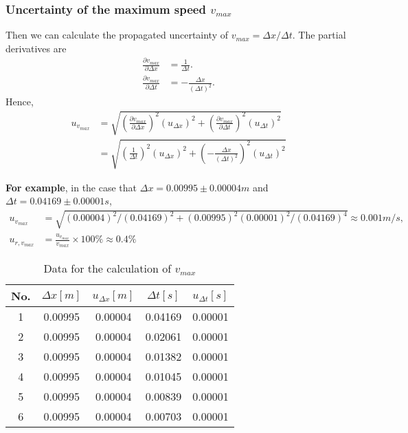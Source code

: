 \subsubsection{Uncertainty of the maximum speed $v_{max}$}
    Then we can calculate the propagated uncertainty of $v_{max}=\Delta x/\Delta t$. The partial derivatives are
    \[
    \begin{split}
        \frac{\partial v_{max}}{\partial \Delta x}&=\frac{1}{\Delta t}.\\[0.5cm]
        \frac{\partial v_{max}}{\partial \Delta t}&=-\frac{\Delta x}{(\Delta t)^2}.    
    \end{split}    
    \]
    Hence,
    \[
    \begin{split}
        u_{v_{max}}&=\sqrt{(\frac{\partial v_{max}}{\partial \Delta x})^2(u_{\Delta x})^2+(\frac{\partial v_{max}}{\partial \Delta t})^2(u_{\Delta t})^2}\\[0.4cm]
        &=\sqrt{(\frac{1}{\Delta t})^2(u_{\Delta x})^2+(-\frac{\Delta x}{(\Delta t)^2})^2(u_{\Delta t})^2}
    \end{split}
    \]

    \textbf{For example}, in the case that $\Delta x=0.00995\pm 0.00004m$ and $\Delta t=0.04169\pm 0.00001s$,
    \[
    \begin{split}
        u_{v_{max}}&=\sqrt{(0.00004)^2/(0.04169)^2+(0.00995)^2(0.00001)^2/(0.04169)^4}\approx0.001m/s,\\
        u_{r,v_{max}}&=\frac{u_{v_{max}}}{v_{max}}\times100\%\approx0.4\%
    \end{split}
    \]
    \begin{table}[!h] \small
        \centering
        \begin{tabular}{|c|c|c|c|c|}
            \hline
            No. & $\Delta x[m]$ & $u_{\Delta x}[m]$ & $\Delta t[s]$ & $u_{\Delta t}[s]$\\ \hline
            1 & 0.00995 & 0.00004 & 0.04169 & 0.00001\\ \hline
            2 & 0.00995 & 0.00004 & 0.02061 & 0.00001\\ \hline
            3 & 0.00995 & 0.00004 & 0.01382 & 0.00001\\ \hline
            4 & 0.00995 & 0.00004 & 0.01045 & 0.00001\\ \hline
            5 & 0.00995 & 0.00004 & 0.00839 & 0.00001\\ \hline
            6 & 0.00995 & 0.00004 & 0.00703 & 0.00001\\ \hline
        \end{tabular}
        \caption{Data for the calculation of $v_{max}$}\label{dt}
    \end{table}


